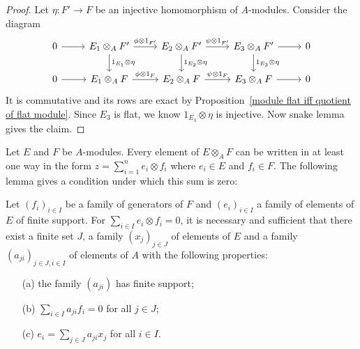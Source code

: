 \begin{proof}
Let $\eta:F'\to F$ be an injective homomorphism of $A$-modules. Consider the diagram
\[\begin{tikzcd}
0\ar[r]&E_1\otimes_AF'\ar[r,"\phi\otimes 1_{F'}"]\ar[d,"1_{E_1}\otimes\eta"]&E_2\otimes_AF'\ar[r,"\psi\otimes 1_{F'}"]\ar[d,"1_{E_2}\otimes\eta"]&E_3\otimes_AF'\ar[r]\ar[d,"1_{E_3}\otimes\eta"]&0\\
0\ar[r]&E_1\otimes_AF\ar[r,"\phi\otimes 1_{F}"]&E_2\otimes_AF\ar[r,"\psi\otimes 1_{F}"]&E_3\otimes_AF\ar[r]&0
\end{tikzcd}\]
It is commutative and its rows are exact by Proposition~\ref{module flat iff quotient of flat module}. Since $E_3$ is flat, we know $1_{E_3}\otimes\eta$ is injective. Now snake lemma gives the claim.
\end{proof}
Let $E$ and $F$ be $A$-modules. Every element of $E\otimes_AF$ can be written in at least one way in the form $z=\sum_{i=1}^{n}e_i\otimes f_i$ where $e_i\in E$ and $f_i\in F$. The following lemma gives a condition under which this sum is zero:
\begin{lemma}\label{module tensor zero iff}
Let $(f_i)_{i\in I}$ be a family of generators of $F$ and $(e_i)_{i\in I}$ a family of elements of $E$ of finite support. For $\sum_{i\in I}e_i\otimes f_i=0$, it is necessary and sufficient that there exist a finite set $J$, a family $(x_j)_{j\in J}$ of elements of $E$ and a family $(a_{ji})_{j\in J,i\in I}$ of elements of $A$ with the following properties:
\begin{itemize}
\item[(a)] the family $(a_{ji})$ has finite support;
\item[(b)] $\sum_{i\in I}a_{ji}f_i=0$ for all $j\in J$;
\item[(c)] $e_i=\sum_{j\in J}a_{ji}x_j$ for all $i\in I$.
\end{itemize}
\end{lemma}
